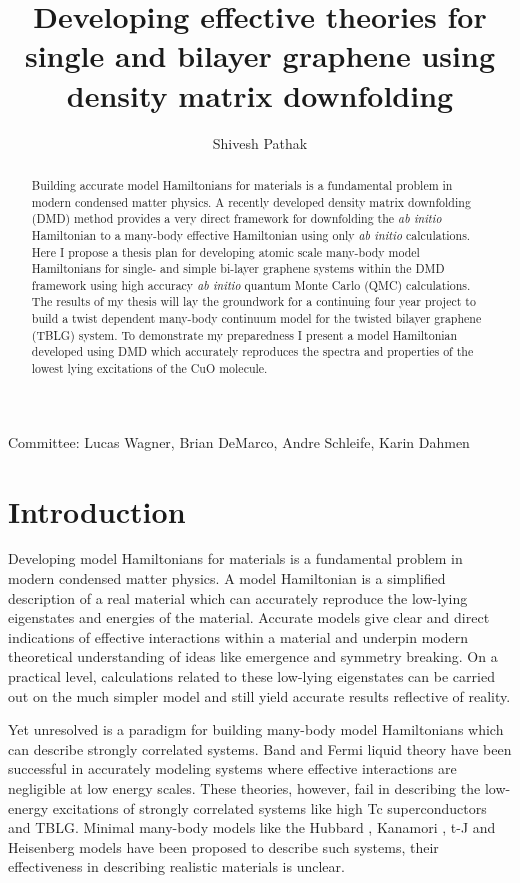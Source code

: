 \documentclass[12pt]{article}
\author{Shivesh Pathak}
\title{Developing effective theories for single and bilayer graphene using density matrix downfolding}
\begin{document}
\maketitle
\begin{abstract}
Building accurate model Hamiltonians for materials is a fundamental problem in modern condensed matter physics.
A recently developed density matrix downfolding (DMD) \cite{Zheng2017} method provides a very direct framework for downfolding the \textit{ab initio} Hamiltonian to a many-body effective Hamiltonian using only \textit{ab initio} calculations. 
Here I propose a thesis plan for developing atomic scale many-body model Hamiltonians for single- and simple bi-layer graphene systems within the DMD framework using high accuracy \textit{ab initio} quantum Monte Carlo (QMC) calculations.
The results of my thesis will lay the groundwork for a continuing four year project to build a twist dependent many-body continuum model for the twisted bilayer graphene (TBLG) system.
To demonstrate my preparedness I present a model Hamiltonian developed using DMD which accurately reproduces the spectra and properties of the lowest lying excitations of the CuO molecule.
\end{abstract}
Committee: Lucas Wagner, Brian DeMarco, Andre Schleife, Karin Dahmen
\pagebreak

\section{Introduction}
Developing model Hamiltonians for materials is a fundamental problem in modern condensed matter physics.
A model Hamiltonian is a simplified description of a real material which can accurately reproduce the low-lying eigenstates and energies of the material.
Accurate models give clear and direct indications of effective interactions within a material and underpin modern theoretical understanding of ideas like emergence and symmetry breaking.
On a practical level, calculations related to these low-lying eigenstates can be carried out on the much simpler model and still yield accurate results reflective of reality.

Yet unresolved is a paradigm for building many-body model Hamiltonians which can describe strongly correlated systems.
Band and Fermi liquid theory have been successful in accurately modeling systems where effective interactions are negligible at low energy scales.
These theories, however, fail in describing the low-energy excitations of strongly correlated systems like high Tc superconductors and TBLG.
Minimal many-body models like the Hubbard \cite{Hubbard1963}, Kanamori \cite{10.1143/PTP.30.275}, t-J \cite{Chao_1977} and Heisenberg models have been proposed to describe such systems, their effectiveness in describing realistic materials is unclear.
\end{document}
